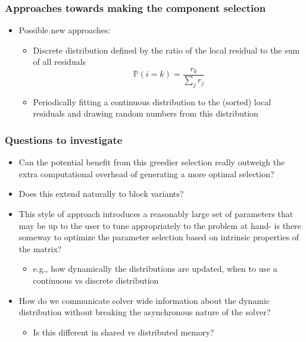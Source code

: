 \documentclass{beamer}
\begin{document}
\begin{frame}
	\frametitle{Approaches towards making the component selection}
	\begin{itemize}
		\item Possible new approaches:
		    \begin{itemize}
		        \item Discrete distribution defined by the ratio of the local residual to the sum of all residuals
		            \begin{equation}
		                \mathbb{P}(i=k) = \frac{r_{k}}{\sum_j r_j}
		            \end{equation}
		        \item Periodically fitting a continuous distribution to the (sorted) local residuals and drawing random numbers from this distribution
		    \end{itemize}
	\end{itemize}
\end{frame}


\begin{frame}
	\frametitle{Questions to investigate}
	\begin{itemize}
		\item Can the potential benefit from this greedier selection really outweigh the extra computational overhead of generating a more optimal selection?
		\item Does this extend naturally to block variants?
		\item This style of approach introduces a reasonably large set of parameters that may be up to the user to tune appropriately to the problem at hand- is there someway to optimize the parameter selection based on intrinsic properties of the matrix?
		    \begin{itemize}
		        \item e.g., how dynamically the distributions are updated, when to use a continuous vs discrete distribution
		    \end{itemize}
	    \item How do we communicate solver wide information about the dynamic distribution without breaking the asynchronous nature of the solver?
	        \begin{itemize}
	            \item Is this different in shared vs distributed memory?
	        \end{itemize}
	\end{itemize}
\end{frame}
\end{document}

